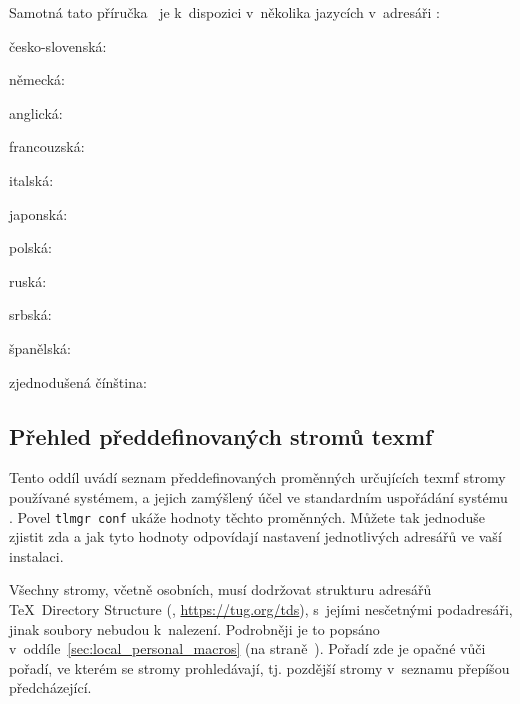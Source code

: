 \documentclass[\classoptions,slovak,english,czech]{\classname}
\def\p.{na straně~}
\begin{document}
Samotná tato příručka \TL\ je k~dispozici v~několika 
jazycích v~adresáři :
\begin{itemize*}
\item{česko-slovenská:} 
\item{německá:} 
\item{anglická:} 
\item{francouzská:} 
\item{italská:} 
\item{japonská:} 
\item{polská:} 
\item{ruská:} 
\item{srbská:} 
\item{španělská:} 
\item{zjednodušená čínština:} 
\end{itemize*}

\subsection{Přehled předdefinovaných stromů texmf}
\label{sec:texmftrees}

Tento oddíl uvádí seznam předdefinovaných proměnných určujících 
texmf stromy používané systémem, a jejich zamýšlený účel
ve standardním uspořádání systému \TL. 
Povel \texttt{tlmgr~conf} ukáže hodnoty těchto proměnných.
Můžete tak jednoduše zjistit zda a jak tyto hodnoty odpovídají
nastavení jednotlivých adresářů ve vaší instalaci.

Všechny stromy, včetně osobních, musí dodržovat strukturu adresářů \TeX\
Directory Structure (\TDS, \url{https://tug.org/tds}), s~jejími nesčetnými 
podadresáři, jinak soubory nebudou k~nalezení. Podrobněji je to 
popsáno v~oddíle~\ref{sec:local_personal_macros} 
(\p.\pageref{sec:local_personal_macros}).
Pořadí zde je opačné vůči pořadí, ve kterém se stromy 
prohledávají, tj. pozdější stromy v~seznamu přepíšou předcházející. 
\end{document}
